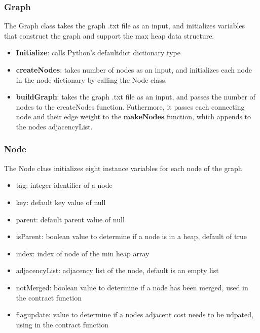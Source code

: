 	\subsubsection{Graph}
	The Graph class takes the graph .txt file as an input, and initializes variables that construct the graph and support the max heap data structure.  
	\begin{itemize}
	\item \textbf{Initialize}: calls Python's defaultdict dictionary type
	\item \textbf{createNodes}: takes number of nodes as an input, and initializes each node in the node dictionary by calling the Node class.
	\item \textbf{buildGraph}: takes the graph .txt file as an input, and passes the number of nodes to the createNodes function. Futhermore, it passes each connecting node and their edge weight to the $\textbf{makeNodes}$ function, which appends to the nodes adjacencyList. 
	\end{itemize}	
	
	\subsubsection{Node}
	The Node class initializes eight instance variables for each node of the graph
	\begin{itemize}
	\item tag: integer identifier of a node 
	\item key: default key value of null
	\item parent: default parent value of null
	\item isParent: boolean value to determine if a node is in a heap, default of true
	\item index: index of node of the min heap array
	\item adjacencyList: adjacency list of the node, default is an empty list
	\item notMerged: boolean value to determine if a node has been merged, used in the contract function 
	\item flagupdate: value to determine if a nodes adjacent cost needs to be udpated, using in the contract function
	\end{itemize}
	
